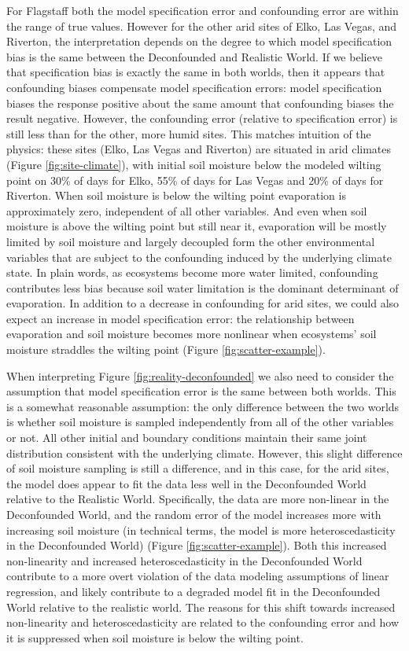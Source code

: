 \documentclass[12pt]{article}
\begin{document}
For Flagstaff both the model specification error and confounding error
are within the range of true values. However for the other arid sites
of Elko, Las Vegas, and Riverton, the interpretation depends on the
degree to which model specification bias is the same between the
Deconfounded and Realistic World. If we believe that specification
bias is exactly the same in both worlds, then it appears that
confounding biases compensate model specification errors: model
specification biases the response positive about the same amount that
confounding biases the result negative. However, the confounding error
(relative to specification error) is still less than for the other,
more humid sites. This matches intuition of the physics: these sites
(Elko, Las Vegas and Riverton) are situated in arid climates (Figure
\ref{fig:site-climate}), with initial soil moisture below the modeled
wilting point on 30\% of days for Elko, 55\% of days for Las Vegas and
20\% of days for Riverton. When soil moisture is below the wilting
point evaporation is approximately zero, independent of all other
variables.  And even when soil moisture is above the wilting point but
still near it, evaporation will be mostly limited by soil moisture and
largely decoupled form the other environmental variables that are
subject to the confounding induced by the underlying climate state. In
plain words, as ecosystems become more water limited, confounding
contributes less bias because soil water limitation is the dominant
determinant of evaporation. In addition to a decrease in confounding
for arid sites, we could also expect an increase in model
specification error: the relationship between evaporation and soil
moisture becomes more nonlinear when ecosystems' soil moisture
straddles the wilting point (Figure \ref{fig:scatter-example}).

When interpreting Figure \ref{fig:reality-deconfounded} we also need
to consider the assumption that model specification error is the same
between both worlds. This is a somewhat reasonable assumption: the
only difference between the two worlds is whether soil moisture is
sampled independently from all of the other variables or not. All
other initial and boundary conditions maintain their same joint
distribution consistent with the underlying climate. However, this
slight difference of soil moisture sampling is still a difference, and
in this case, for the arid sites, the model does appear to fit the
data less well in the Deconfounded World relative to the Realistic
World. Specifically, the data are more non-linear in the Deconfounded
World, and the random error of the model increases more with
increasing soil moisture (in technical terms, the model is more
heteroscedasticity in the Deconfounded World) (Figure
\ref{fig:scatter-example}). Both this increased non-linearity and
increased heteroscedasticity in the Deconfounded World contribute to a
more overt violation of the data modeling assumptions of linear regression,
and likely contribute to a degraded model fit in the Deconfounded
World relative to the realistic world. The reasons for this shift
towards increased non-linearity and heteroscedasticity are related to
the confounding error and how it is suppressed when soil moisture is
below the wilting point.
\end{document}
